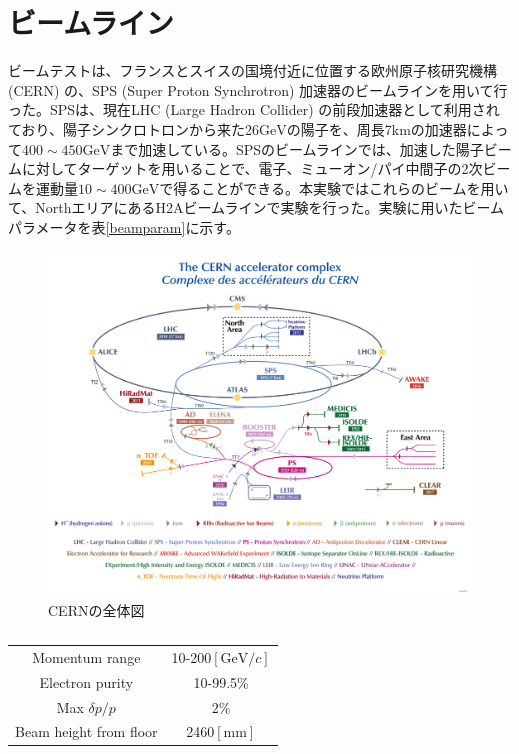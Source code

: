 \section{ビームライン}
ビームテストは、フランスとスイスの国境付近に位置する欧州原子核研究機構 (CERN) の、SPS (Super Proton Synchrotron) 加速器のビームラインを用いて行った。SPSは、現在LHC (Large Hadron Collider) の前段加速器として利用されており、陽子シンクロトロンから来た26$\mathrm{GeV}$の陽子を、周長7kmの加速器によって$400\sim 450 \mathrm{GeV}$まで加速している。SPSのビームラインでは、加速した陽子ビームに対してターゲットを用いることで、電子、ミューオン/パイ中間子の2次ビームを運動量$10\sim 400 \mathrm{GeV}$で得ることができる。本実験ではこれらのビームを用いて、NorthエリアにあるH2Aビームラインで実験を行った。実験に用いたビームパラメータを表\ref{beamparam}に示す。\\
\begin{figure}[H]
	\begin{center}
 \includegraphics[keepaspectratio, scale=0.7]
 	{Figure/Beamtest/cern.png}
 		\caption{CERNの全体図}
	\end{center}
\end{figure}
\begin{table}[H]
 \centering
 \begin{tabular}{c c}
 \hline
Momentum range & 10-200$[ \mathrm{GeV}/ c ]$\\
Electron purity & 10-99.5\%\\
Max $\delta p / p$  & $2\%$\\
Beam height from floor & 2460$[ \mathrm{mm}]$\\
 \hline
 \end{tabular}
 \label{layer}
 \caption{}
\end{table}

